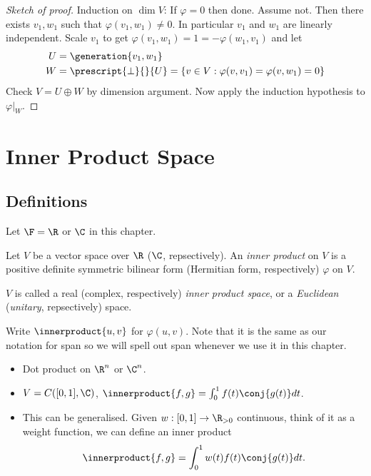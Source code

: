 \documentclass[a4paper]{article}
\newcommand*{\spans}{\generation}
\newcommand*{\ip}{\innerproduct}
\theoremstyle{definition}
\begin{document}
\begin{proof}[Sketch of proof]
  Induction on \(\dim V\): If \(\varphi = 0\) then done. Assume not. Then there exists \(v_1, w_1\) such that \(\varphi(v_1, w_1) \neq 0\). In particular \(v_1\) and \(w_1 \) are linearly independent. Scale \(v_1\) to get \(\varphi(v_1, w_1) = 1 = -\varphi(w_1, v_1)\) and let
  \begin{align*}
    U &= \spans{v_1, w_1} \\
    W &= \prescript{\perp}{}{U} = \{ v\in V: \varphi(v, v_1) = \varphi(v, w_1) = 0 \}
  \end{align*}
  Check \(V = U \oplus W\) by dimension argument. Now apply the induction hypothesis to \(\varphi|_W\).
\end{proof}

\section{Inner Product Space}

\subsection{Definitions}

Let \(\F = \R\) or \(\C\) in this chapter.

\begin{definition}
  Let \(V\) be a vector space over \(\R\) (\(\C\), repsectively). An \emph{inner product} on \(V\) is a positive definite symmetric bilinear form (Hermitian form, respectively) \(\varphi\) on \(V\).

  \(V\) is called a real (complex, respectively) \emph{inner product space}, or a \emph{Euclidean} (\emph{unitary}, repsectively) space.
\end{definition}

\begin{notation}
  Write \(\ip{u, v}\) for \(\varphi(u, v)\). Note that it is the same as our notation for span so we will spell out span whenever we use it in this chapter.
\end{notation}

\begin{eg}\leavevmode
  \begin{itemize}
  \item Dot product on \(\R^n\) or \(\C^n\).
  \item \(V = C([0, 1], \C)\), \(\ip{f, g} = \int_0^1 f(t) \conj{g(t)} dt\).
  \item This can be generalised. Given \(w: [0, 1] \to \R_{> 0}\) continuous, think of it as a weight function, we can define an inner product
    \[
      \ip{f, g} = \int_{0}^{1} w(t)f(t)\conj{g(t)} dt.
    \]
  \end{itemize}
\end{eg}
\end{document}
